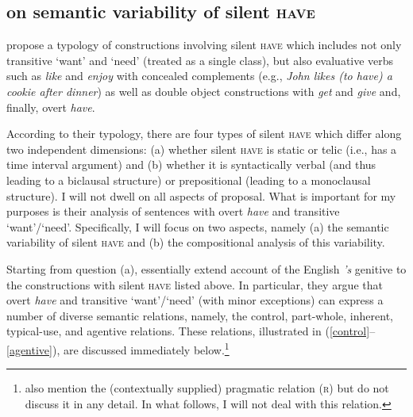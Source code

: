 \documentclass[output=paper]{langscibook}
\begin{document}
\subsection{\citeauthor{Zaroukian.Beller2013} on semantic variability of silent \textsc{have}}\label{section-zaroukian}

\citet{Zaroukian.Beller2013} propose a typology of constructions involving silent \textsc{have} which includes not only transitive `want' and `need' (treated as a single class), but also evaluative verbs such as \textit{like} and \textit{enjoy} with concealed complements (e.g., \textit{John likes (to have) a cookie after dinner}) as well as double object constructions with \textit{get} and \textit{give} and, finally, overt \textit{have}.

According to their typology, there are four types of silent \textsc{have} which differ along two independent dimensions: (a) whether silent \textsc{have} is static or telic (i.e., has a time interval argument) and (b) whether it is syntactically verbal (and thus leading to a biclausal structure) or prepositional (leading to a monoclausal structure). I will not dwell on all aspects of  proposal. What is important for my purposes is their analysis of sentences with overt \textit{have} and transitive `want'/`need'. Specifically, I will focus on two aspects, namely (a) the semantic variability of silent \textsc{have} and (b) the compositional analysis of this variability.

Starting from question (a), \citet{Zaroukian.Beller2013} essentially extend  account of the English \textit{'s} genitive to the constructions with silent \textsc{have} listed above. In particular, they argue that overt \textit{have} and transitive `want'/`need' (with minor exceptions) can express a number of diverse semantic relations, namely, the control, part-whole, inherent, typical-use, and agentive relations. These relations, illustrated in (\ref{control}--\ref{agentive}), are discussed immediately below.\footnote{\citeauthor{Zaroukian.Beller2013} also mention the (contextually supplied) pragmatic relation (\textsc{r}) but do not discuss it in any detail. In what follows, I will not deal with this relation.}
\end{document}
